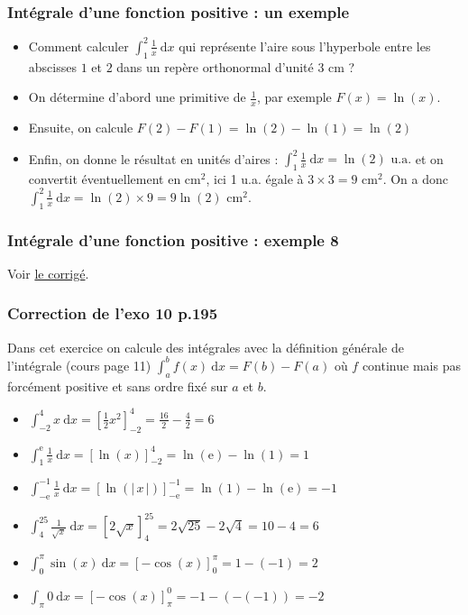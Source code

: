 \documentclass[11pt, hyperref={urlcolor=red,%
            linkcolor=blue, %
            colorlinks=true}]{beamer}
\newcommand{\dx}{\ensuremath{\text{d}x}}		%
\newcommand{\integralex}[3]{\int_{#1}^{#2} #3 \ \dx}
\newcommand{\valabs}[1]{\big| \, #1 \, \big|}
\begin{document}
\begin{frame}
\frametitle{Intégrale d'une fonction positive : un exemple}

\begin{itemize}
\item  Comment calculer $\integralex{1}{2}{\frac{1}{x}}$ qui représente l'aire sous l'hyperbole entre les abscisses $1$ et $2$ dans un repère orthonormal d'unité 3 cm ?
\pause \item On détermine d'abord une primitive de $\frac{1}{x}$, par exemple $F(x)=\ln(x)$. 
\pause \item Ensuite, on calcule $F(2)-F(1)=\ln(2)-\ln(1)=\ln(2)$
\pause \item Enfin, on donne le résultat en unités d'aires :   $\integralex{1}{2}{\frac{1}{x}}=\ln(2) \text{ u.a.}$
et on convertit éventuellement en cm$^{2}$, ici 1 u.a. égale à $3 \times  3 = 9 $ cm$^{2}$.
On a donc $\integralex{1}{2}{\frac{1}{x}}=\ln(2) \times 9 = 9\ln(2)$ cm$^{2}$.
\end{itemize}

\end{frame}



\begin{frame}
\frametitle{Intégrale d'une fonction positive : exemple 8}
\label{exemple8}

Voir \href{../CalcuIntegral/Corrige-Cours-CalculIntegralPartie2-2020.pdf}{le corrigé}.

\end{frame}



\begin{frame}
\frametitle{Correction de l'exo 10 p.195}
\label{exo10}

Dans cet exercice on calcule des intégrales avec la définition générale de l'intégrale (cours page   11) $\integralex{a}{b}{f(x)}=F(b)-F(a)$ où $f$ continue mais pas forcément positive et sans ordre fixé sur $a$ et $b$.
\begin{itemize}
 \item $\integralex{-2}{4}{x}=\left[\frac{1}{2}x^{2} \right]_{-2}^{4} =\frac{16}{2}-\frac{4}{2}=6 $ 
\item $\integralex{1}{\text{e}}{\frac{1}{x}}=\left[\ln(x) \right]_{-2}^{4} =\ln(\text{e})-\ln(1)=1 $ 
\item $\integralex{-\text{e}}{-1}{\frac{1}{x}}=\left[\ln(\valabs{x}) \right]_{-\text{e}}^{-1} =\ln(1)-\ln(\text{e})=-1$ 
\item $\integralex{4}{25}{\frac{1}{\sqrt{x}}}=\left[2\sqrt{x} \right]_{4}^{25} =2\sqrt{25}-2\sqrt{4}=10-4=6 $ 
\item $\integralex{0}{\pi}{\sin(x)}=\left[-\cos(x)\right]_{0}^{\pi} =1 - (-1) = 2$ 
\item $\integralex{\pi}{}{0}=\left[-\cos(x)\right]_{\pi}^{0} =-1 - (-(-1)) = -2$ 
\end{itemize}

\end{frame}
\end{document}
